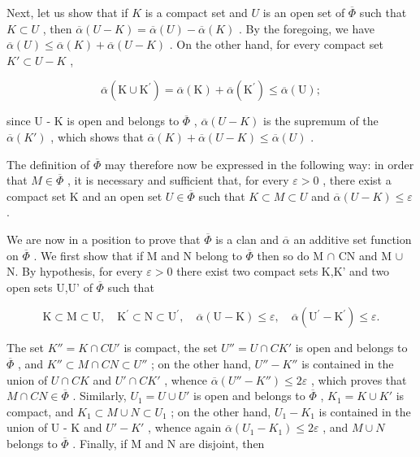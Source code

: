 Next, let us show that if \(K\) is a compact set and \(U\) is an open set of \(\overline{\Phi}\) such that \(K \subset U\) , then \(\overline{\alpha}(U - K) = \overline{\alpha}(U) - \overline{\alpha}(K)\) . By the foregoing, we have \(\overline{\alpha}(U) \leqslant \overline{\alpha}(K) + \overline{\alpha}(U - K)\) . On the other hand, for every compact set \(K' \subset U - K\) ,

\[
\overline {{{{\alpha}}}} (\mathrm{K} \cup \mathrm{K} ^ {\prime}) = \overline {{{{\alpha}}}} (\mathrm{K}) + \overline {{{{\alpha}}}} (\mathrm{K} ^ {\prime}) \leqslant \overline {{{{\alpha}}}} (\mathrm{U});
\]

since U - K is open and belongs to \(\overline{\Phi}\) , \(\overline{\alpha}(U - K)\) is the supremum of the \(\overline{\alpha}(K')\) , which shows that \(\overline{\alpha}(K) + \overline{\alpha}(U - K) \leqslant \overline{\alpha}(U)\) .

The definition of \(\overline{\Phi}\) may therefore now be expressed in the following way: in order that \(M \in \overline{\Phi}\) , it is necessary and sufficient that, for every \(\varepsilon > 0\) , there exist a compact set K and an open set \(U \in \overline{\Phi}\) such that \(K \subset M \subset U\) and \(\overline{\alpha}(U - K) \leqslant \varepsilon\) .

We are now in a position to prove that \(\overline{\Phi}\) is a clan and \(\overline{\alpha}\) an additive set function on \(\overline{\Phi}\) . We first show that if M and N belong to \(\overline{\Phi}\) then so do M \(\cap\) CN and M \(\cup\) N. By hypothesis, for every \(\varepsilon > 0\) there exist two compact sets K,K' and two open sets U,U' of \(\overline{\Phi}\) such that

\[
\mathrm{K} \subset \mathrm{M} \subset \mathrm{U}, \quad \mathrm{K} ^ {\prime} \subset \mathrm{N} \subset \mathrm{U} ^ {\prime}, \quad \overline {{\alpha}} (\mathrm{U} - \mathrm{K}) \leqslant \varepsilon , \quad \overline {{\alpha}} (\mathrm{U} ^ {\prime} - \mathrm{K} ^ {\prime}) \leqslant \varepsilon .
\]

The set \(K'' = K \cap C U'\) is compact, the set \(U'' = U \cap C K'\) is open and belongs to \(\overline{\Phi}\) , and \(K'' \subset M \cap C N \subset U''\) ; on the other hand, \(U'' - K''\) is contained in the union of \(U \cap C K\) and \(U' \cap C K'\) , whence \(\overline{\alpha}(U'' - K'') \leqslant 2\varepsilon\) , which proves that \(M \cap C N \in \overline{\Phi}\) . Similarly, \(U_1 = U \cup U'\) is open and belongs to \(\overline{\Phi}\) , \(K_1 = K \cup K'\) is compact, and \(K_1 \subset M \cup N \subset U_1\) ; on the other hand, \(U_1 - K_1\) is contained in the union of U - K and \(U' - K'\) , whence again \(\overline{\alpha}(U_1 - K_1) \leqslant 2\varepsilon\) , and \(M \cup N\) belongs to \(\overline{\Phi}\) . Finally, if M and N are disjoint, then

